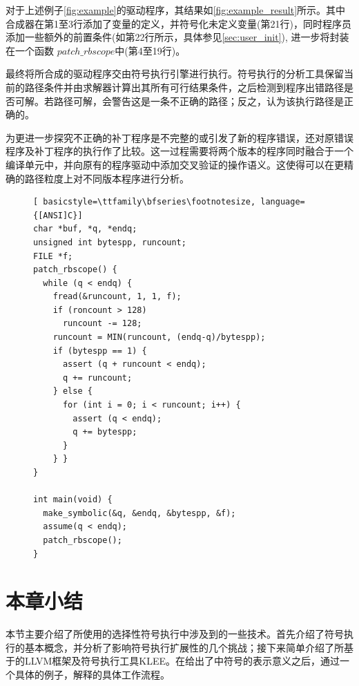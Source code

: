 对于上述例子\autoref{fig:example}的驱动程序，其结果如\autoref{fig:example_result}所示。其中合成器在第1至3行添加了变量的定义，并符号化未定义变量(第21行)，同时程序员添加一些额外的前置条件(如第22行所示，具体参见\autoref{sec:user_init}), 进一步将\rbscope 封装在一个函数 $patch\_rbscope$中(第4至19行)。

最终将所合成的驱动程序交由符号执行引擎进行执行。符号执行的分析工具保留当前的路径条件并由求解器计算出其所有可行结果条件，之后检测到程序出错路径是否可解。若路径可解，\dryrun 会警告这是一条不正确的路径；反之，认为该执行路径是正确的。

为更进一步探究不正确的补丁程序是不完整的或引发了新的程序错误，\dryrun 还对原错误程序及补丁程序的执行作了比较。这一过程需要将两个版本的程序同时融合于一个编译单元中，并向原有的程序驱动中添加交叉验证的操作语义。这使得可以在更精确的路径粒度上对不同版本程序进行分析。

\begin{figure}[t]
\begin{center}
\begin{lstlisting}[ basicstyle=\ttfamily\bfseries\footnotesize, language={[ANSI]C}]
char *buf, *q, *endq;
unsigned int bytespp, runcount;
FILE *f;
patch_rbscope() {
  while (q < endq) {
    fread(&runcount, 1, 1, f);
    if (roncount > 128)
      runcount -= 128;
    runcount = MIN(runcount, (endq-q)/bytespp);
    if (bytespp == 1) {
      assert (q + runcount < endq);
      q += runcount;
    } else {
      for (int i = 0; i < runcount; i++) {
        assert (q < endq);
        q += bytespp;
      }
    } }
}

int main(void) {
  make_symbolic(&q, &endq, &bytespp, &f);
  assume(q < endq);
  patch_rbscope();
}
\end{lstlisting}
\vspace{-0.5cm}
\end{center}
\end{figure}

\section{本章小结}
\label{sec:c2}
本节主要介绍了\dryrun 所使用的选择性符号执行中涉及到的一些技术。首先介绍了符号执行的基本概念，并分析了影响符号执行扩展性的几个挑战；接下来简单介绍了\dryrun 所基于的LLVM框架及符号执行工具KLEE。在给出了中符号的表示意义之后，通过一个具体的例子，解释\dryrun 的具体工作流程。